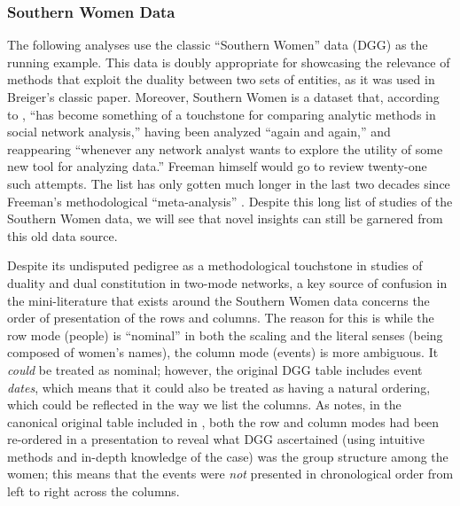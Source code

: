 \documentclass[a4paper,fleqn]{cas-sc}
\begin{document}
\subsubsection{Southern Women Data}
The following analyses use the classic ``Southern Women'' data \citep{davis1941} (DGG) as the running example. This data is doubly appropriate for showcasing the relevance of methods that exploit the duality between two sets of entities, as it was used in Breiger's \citeyearpar{breiger1974duality} classic paper. Moreover, Southern Women is a dataset that, according to \citet[p.]{freeman2003finding}, ``has become something of a touchstone for comparing analytic methods in social network analysis,'' having been analyzed ``again and again,'' and reappearing ``whenever any network analyst wants to explore the utility of some new tool for analyzing data.'' Freeman himself would go to review twenty-one such attempts. The list has only gotten much longer in the last two decades since Freeman's methodological ``meta-analysis'' \citep[e.g.,][among many others]{doreian2004generalized, field2006identifying, roffilli2006identifying, wang2009exponential, kovacs2010generalized, brusco2011analysis, borgatti2014analyzing, everett2013dual, lerner2022dynamic, batagelj2022analysis, lizardo2024two}. Despite this long list of studies of the Southern Women data, we will see that novel insights can still be garnered from this old data source.

Despite its undisputed pedigree as a methodological touchstone in studies of duality and dual constitution in two-mode networks, a key source of confusion in the mini-literature that exists around the Southern Women data concerns the order of presentation of the rows and columns. The reason for this is while the row mode (people) is ``nominal'' in both the scaling and the literal senses (being composed of women's names), the column mode (events) is more ambiguous. It \textit{could} be treated as nominal; however, the original DGG table includes event \textit{dates}, which means that it could also be treated as having a natural ordering, which could be reflected in the way we list the columns.  As \citet{freeman2003finding} notes, in the canonical original table included in \citet{davis1941}, both the row and column modes had been re-ordered in a presentation to reveal what DGG ascertained (using intuitive methods and in-depth knowledge of the case) was the group structure among the women; this means that the events were \textit{not} presented in chronological order from left to right across the columns. 
\end{document}
